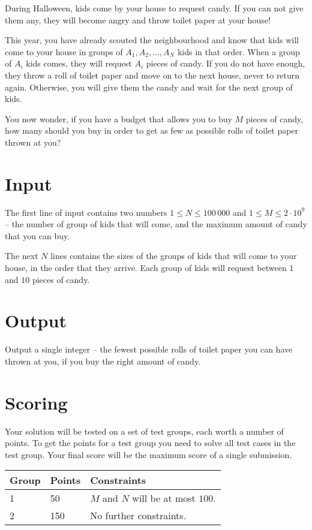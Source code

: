 During Halloween, kids come by your house to request candy.
If you can not give them any, they will become angry and throw toilet paper at your house!

This year, you have already scouted the neighbourhood and know that kids will come to your house in groups of $A_1, A_2, \dots, A_N$ kids in that order.
When a group of $A_i$ kids comes, they will request $A_i$ pieces of candy.
If you do not have enough, they throw a roll of toilet paper and move on to the next house, never to return again.
Otherwise, you will give them the candy and wait for the next group of kids.

You now wonder, if you have a budget that allows you to buy $M$ pieces of candy, how many should you buy in order to get as few as possible rolls of toilet paper thrown at you?

\section*{Input}
The first line of input contains two numbers $1 \le N \le 100\,000$ and $1 \le M \le 2 \cdot 10^9$ -- the number of group of kids that will come, and the maximum amount of candy that you can buy.

The next $N$ lines contains the sizes of the groups of kids that will come to your house, in the order that they arrive.
Each group of kids will request between $1$ and $10$ pieces of candy.

\section*{Output}
Output a single integer -- the fewest possible rolls of toilet paper you can have thrown at you, if you buy the right amount of candy.

\section*{Scoring}
Your solution will be tested on a set of test groups, each worth a number of points.
To get the points for a test group you need to solve all test cases in the test group.
Your final score will be the maximum score of a single submission.

\noindent
\begin{tabular}{| l | l | l |}
\hline
Group & Points & Constraints \\ \hline
1     & 50     & $M$ and $N$ will be at most $100$. \\ \hline
2     & 150    & No further constraints. \\ \hline
\end{tabular}
